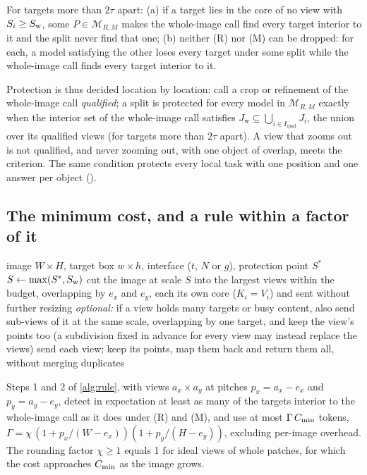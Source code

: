 \begin{proposition}
\label{prop:tight}
For targets more than $2\tau$ apart: (a) if a target lies in the core of no view with $S_i \ge S_{\mathrm{w}}$, some $P \in \mathcal{M}_{R,M}$ makes the whole-image call find every target interior to it and the split never find that one; (b) neither (R) nor (M) can be dropped: for each, a model satisfying the other loses every target under some split while the whole-image call finds every target interior to it.
\end{proposition}

Protection is thus decided location by location: call a crop or refinement of the whole-image call \emph{qualified}; a split is protected for every model in $\mathcal{M}_{R,M}$ exactly when the interior set of the whole-image call satisfies \mbox{$J_{\mathrm{w}} \subseteq \bigcup\nolimits_{i \in I_{\mathrm{qual}}} J_i$}, the union over its qualified views (for targets more than $2\tau$ apart). A view that zooms out is not qualified, and never zooming out, with one object of overlap, meets the criterion. The same condition protects every local task with one position and one answer per object ().

\subsection{The minimum cost, and a rule within a factor of it}

\begin{algorithm}[t]
\caption{Safe splitting near the minimum cost}
\label{alg:rule}
\begin{algorithmic}[1]
\Require image $W \times H$, target box $w \times h$, interface ($t$, $N$ or $g$), protection point $S^\ast$
\State $S \gets \max(S^\ast, S_{\mathrm{w}})$ 
\State cut the image at scale $S$ into the largest views within the budget, overlapping by $e_x$ and $e_y$, each its own core ($K_i = V_i$) and sent without further resizing
\State \emph{optional:} if a view holds many targets or busy content, also send sub-views of it at the same scale, overlapping by one target, and keep the view's points too (a subdivision fixed in advance for every view may instead replace the views)
\State send each view; keep its points, map them back and return them all, without merging duplicates
\end{algorithmic}
\end{algorithm}

\begin{corollary}
\label{cor:safe}
Steps 1 and 2 of \cref{alg:rule}, with views $a_x \times a_y$ at pitches $p_x = a_x - e_x$ and $p_y = a_y - e_y$, detect in expectation at least as many of the targets interior to the whole-image call as it does under (R) and (M), and use at most $\Gamma\,C_{\min}$ tokens, $\Gamma = \chi\,(1 + p_x/(W - e_x))(1 + p_y/(H - e_y))$, excluding per-image overhead. The rounding factor $\chi \ge 1$ equals 1 for ideal views of whole patches, for which the cost approaches $C_{\min}$ as the image grows.
\end{corollary}

